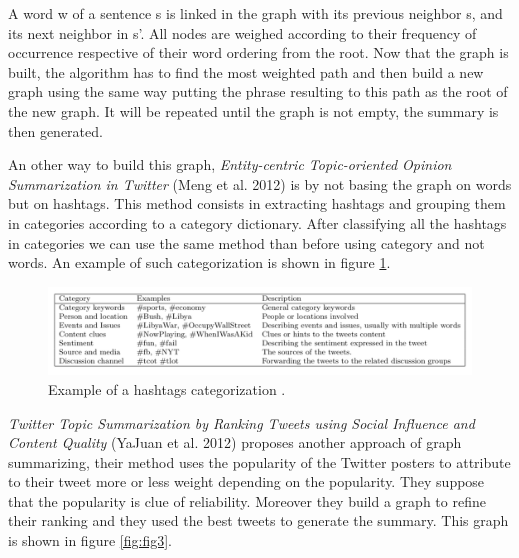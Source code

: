 \documentclass[runningheads]{llncs}
\begin{document}
A word w of a sentence s is linked in the graph with its previous neighbor s,
and its next neighbor in s'. All nodes are weighed according to their frequency
of occurrence respective of their word ordering from the root. Now that the
graph is built, the algorithm has to find the most weighted path and then build
a new graph using the same way putting the phrase resulting to this path as the
root of the new graph. It will be repeated until the graph is not empty, the
summary is then generated.

An other way to build this graph, \textit{Entity-centric Topic-oriented Opinion
Summarization in Twitter} (Meng et al. 2012) \cite{meng_entity-centric_2012} is
by not basing the graph on words but on hashtags. This method consists in
extracting hashtags and grouping them in categories according to a category
dictionary. After classifying all the hashtags in categories we can use the
same method than before using category and not words. An example of such
categorization is shown in figure \ref{fig:fig2}.

\begin{figure}[H]
    \includegraphics[width=\textwidth]{fig2.png}
    \caption{Example of a hashtags categorization
    \cite{meng_entity-centric_2012}.}
    \label{fig:fig2}
\end{figure}

\textit{Twitter Topic Summarization by Ranking Tweets using Social Influence
and Content Quality} (YaJuan et al. 2012) \cite{duan_twitter_2012} proposes
another approach of graph summarizing, their method uses the popularity of the
Twitter posters to attribute to their tweet more or less weight depending on
the popularity. They suppose that the popularity is clue of reliability.
Moreover they build a graph to refine their ranking and they used the best
tweets to generate the summary. This graph is shown in figure \ref{fig:fig3}.
\end{document}
